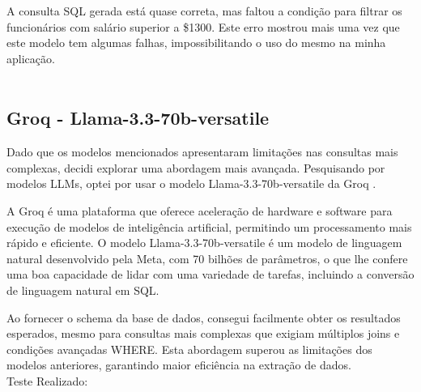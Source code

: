 \documentclass{article}
\begin{document}
A consulta SQL gerada está quase correta, mas faltou a condição para filtrar os funcionários com salário superior a \$1300. Este erro mostrou mais uma vez que este modelo tem algumas falhas, impossibilitando o uso do mesmo na minha aplicação.
\\
\\

\subsection{Groq - Llama-3.3-70b-versatile}
\hspace*{1em} Dado que os modelos mencionados apresentaram limitações nas consultas mais complexas, decidi explorar uma abordagem mais avançada. Pesquisando por modelos LLMs, optei por usar o modelo Llama-3.3-70b-versatile da Groq \cite{groq2025}.

A Groq é uma plataforma que oferece aceleração de hardware e software para execução de modelos de inteligência artificial, permitindo um processamento mais rápido e eficiente. O modelo Llama-3.3-70b-versatile é um modelo de linguagem natural desenvolvido pela Meta, com 70 bilhões de parâmetros, o que lhe confere uma boa capacidade de lidar com uma variedade de tarefas, incluindo a conversão de linguagem natural em SQL.

Ao fornecer o schema da base de dados, consegui facilmente obter os resultados esperados, mesmo para consultas mais complexas que exigiam múltiplos joins e condições avançadas WHERE. Esta abordagem superou as limitações dos modelos anteriores, garantindo maior eficiência na extração de dados.
\\
Teste Realizado:
\end{document}
